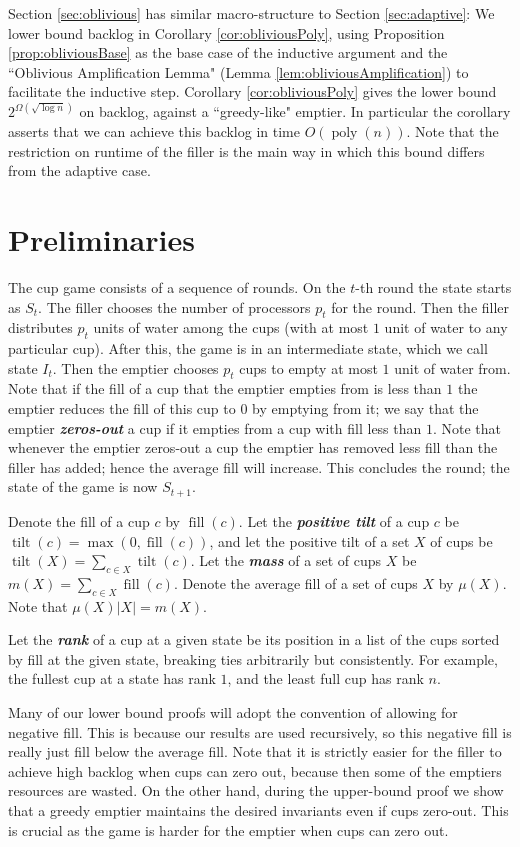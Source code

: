\documentclass[twocolumn]{article}[10pt]
\newcommand{\defn}[1]{{\textit{\textbf{\boldmath #1}}}\xspace}
\DeclareMathOperator{\poly}{\text{poly}}
\DeclareMathOperator{\tilt}{\text{tilt}}
\DeclareMathOperator{\fil}{\text{fill}}
\begin{document}
Section \ref{sec:oblivious} has similar macro-structure to Section
\ref{sec:adaptive}: We lower bound backlog in Corollary
\ref{cor:obliviousPoly}, using Proposition \ref{prop:obliviousBase} as the base
case of the inductive argument and the ``Oblivious Amplification Lemma" (Lemma
\ref{lem:obliviousAmplification}) to facilitate the inductive step. Corollary
\ref{cor:obliviousPoly} gives the lower bound $2^{\Omega(\sqrt{\log n})}$ on
backlog, against a ``greedy-like" emptier. In particular the corollary asserts
that we can achieve this backlog in time $O(\poly(n))$. Note that the
restriction on runtime of the filler is the main way in which this bound
differs from the adaptive case.

\section{Preliminaries}\label{sec:prelims}
The cup game consists of a sequence of rounds. On the $t$-th round the state
starts as $S_t$. The filler chooses the number of processors $p_t$ for the
round. Then the filler distributes $p_t$ units of water among the cups (with at
most $1$ unit of water to any particular cup). After this, the game is in an
intermediate state, which we call state $I_t$. Then the emptier chooses $p_t$
cups to empty at most $1$ unit of water from. Note that if the fill of a cup
that the emptier empties from is less than $1$ the emptier reduces the fill of
this cup to $0$ by emptying from it; we say that the emptier \defn{zeros-out} a
cup if it empties from a cup with fill less than $1$. Note that whenever the
emptier zeros-out a cup the emptier has removed less fill than the filler has
added; hence the average fill will increase. This concludes the round; the
state of the game is now $S_{t+1}$.

Denote the fill of a cup $c$ by $\fil(c)$. Let the \defn{positive tilt} of a cup $c$ be
$\tilt(c) = \max(0, \fil(c))$, and let the positive tilt of a set $X$ of
cups be $\tilt(X) = \sum_{c\in X} \tilt(c)$. Let the \defn{mass} of a set of cups $X$
be $m(X) = \sum_{c\in X} \fil(c)$. Denote the average fill of a set of cups $X$
by $\mu(X)$. Note that $\mu(X) |X| = m(X)$.

Let the \defn{rank} of a cup at a given state be its position in a list of the
cups sorted by fill at the given state, breaking ties arbitrarily but
consistently. For example, the fullest cup at a state has rank $1$, and the
least full cup has rank $n$.

Many of our lower bound proofs will adopt the convention of allowing for
negative fill. This is because our results are used recursively, so this
negative fill is really just fill below the average fill. Note that it is
strictly easier for the filler to achieve high backlog when cups can zero out,
because then some of the emptiers resources are wasted. On the other hand,
during the upper-bound proof we show that a greedy emptier maintains the
desired invariants even if cups zero-out. This is crucial as the game is harder
for the emptier when cups can zero out.
\end{document}
